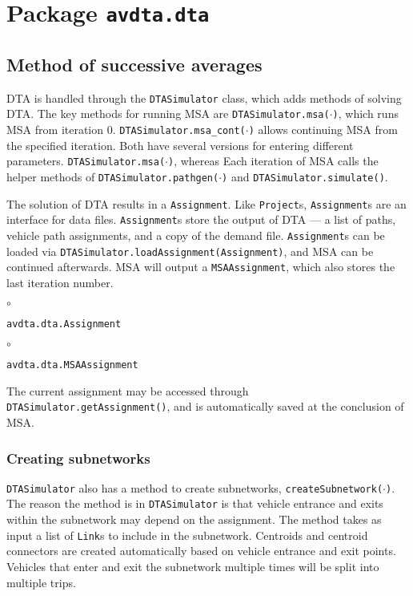 \chapter{Package \texttt{avdta.dta}}


\section{Method of successive averages}

DTA is handled through the \texttt{DTASimulator} class, which adds methods of solving DTA. The key methods for running MSA are \texttt{DTASimulator.msa($\cdot$)}, which runs MSA from iteration 0.  \texttt{DTASimulator.msa\_cont($\cdot$)} allows continuing MSA from the specified iteration. Both have several versions for entering different parameters. \texttt{DTASimulator.msa($\cdot$)}, whereas  Each iteration of MSA calls the helper methods of \texttt{DTASimulator.pathgen($\cdot$)} and \texttt{DTASimulator.simulate()}. 

The solution of DTA results in a \texttt{Assignment}. Like \texttt{Project}s, \texttt{Assignment}s are an interface for data files. \texttt{Assignment}s store the output of DTA --- a list of paths, vehicle path assignments, and a copy of the demand file. \texttt{Assignment}s can be loaded via \texttt{DTASimulator.loadAssignment(Assignment)}, and MSA can be continued afterwards. MSA will output a \texttt{MSAAssignment}, which also stores the last iteration number. 
\begin{list}{$\circ$}{}
	\item \texttt{avdta.dta.Assignment}
	
	\begin{list}{$\circ$}{}
		\item \texttt{avdta.dta.MSAAssignment}
	\end{list}
\end{list}
The current assignment may be accessed through \texttt{DTASimulator.getAssignment()}, and is automatically saved at the conclusion of MSA.

\subsection{Creating subnetworks}

\texttt{DTASimulator} also has a method to create subnetworks, \texttt{createSubnetwork($\cdot$)}. The reason the method is in \texttt{DTASimulator} is that vehicle entrance and exits within the subnetwork may depend on the assignment. The method takes as input a list of \texttt{Link}s to include in the subnetwork. Centroids and centroid connectors are created automatically based on vehicle entrance and exit points. Vehicles that enter and exit the subnetwork multiple times will be split into multiple trips. 